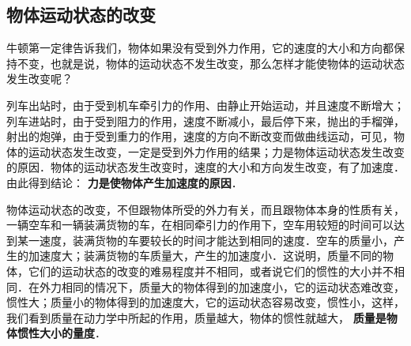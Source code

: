 \begin{Test}
\section{物体运动状态的改变}
牛顿第一定律告诉我们，物体如果没有受到外力作用，它的速度的大小和方向都保持不变，也就是说，物体的运动状态不发生改变，那么怎样才能使物体的运动状态发生改变呢？

列车出站时，由于受到机车牵引力的作用、由静止开始运动，并且速度不断增大；列车进站时，由于受到阻力的作用，速度不断减小，最后停下来，抛出的手榴弹，射出的炮弹，由于受到重力的作用，速度的方向不断改变而做曲线运动，可见，物体的运动状态发生改变，一定是受到外力作用的结果；力是物体运动状态发生改变的原因．物体的运动状态发生改变时，速度的大小和方向发生改变，有了加速度．由此得到结论：\textbf{ 力是使物体产生加速度的原因}．

物体运动状态的改变，不但跟物体所受的外力有关，而且跟物体本身的性质有关，一辆空车和一辆装满货物的车，在相同牵引力的作用下，空车用较短的时间可以达到某一速度，装满货物的车要较长的时间才能达到相同的速度．空车的质量小，产生的加速度大；装满货物的车质量大，产生的加速度小．这说明，质量不同的物体，它们的运动状态的改变的难易程度并不相同，或者说它们的惯性的大小并不相同．在外力相同的情况下，质量大的物体得到的加速度小，它的运动状态难改变，惯性大；质量小的物体得到的加速度大，它的运动状态容易改变，惯性小，这样，我们看到质量在动力学中所起的作用，质量越大，物体的惯性就越大，\textbf{ 质量是物体惯性大小的量度}．


\end{Test}
